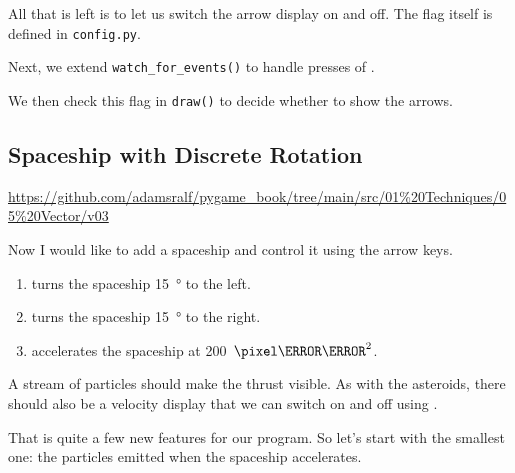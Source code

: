 All that is left is to let us switch the arrow display on and off. The flag itself is defined in \texttt{config.py}.


Next, we extend \texttt{watch\_for\_events()} to handle presses of .


We then check this flag in \texttt{draw()} to decide whether to show the arrows.


\newpage
\subsection{Spaceship with Discrete Rotation}\label{secVectorSpaceshipRotationSkip}

\begin{diskbox}
	\url{https://github.com/adamsralf/pygame_book/tree/main/src/01%20Techniques/05%20Vector/v03}
\end{diskbox}

Now I would like to add a spaceship and control it using the arrow keys.
\begin{enumerate}
	\item \keys{$\leftarrow$} turns the spaceship \SI{15}{\degree} to the left.
	\item \keys{$\rightarrow$} turns the spaceship \SI{15}{\degree} to the right.
	\item \keys{$\uparrow$} accelerates the spaceship at \SI{200}{$\pixel\per\second  ^2$}.
\end{enumerate}
A stream of particles should make the thrust visible. As with the asteroids, there should also be a velocity display that we can switch on and off using .
\er

That is quite a few new features for our program. So let's start with the smallest one: the particles emitted when the spaceship accelerates.

